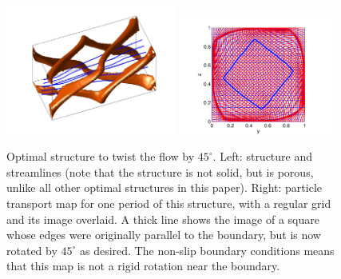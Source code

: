 \documentclass[times]{fldauth}
\begin{document}
\begin{figure}
  \centerline{
    \includegraphics[width=0.5\textwidth,trim=60 30 50 20,clip]{example3structure}
    \hfill
    \includegraphics[width=0.45\textwidth,trim=50 0 60 20,clip]{example3grid}}
  \caption{\label{example3figure1} Optimal structure to twist the flow
    by $45^\circ$. Left: structure and streamlines (note that the
    structure is not solid, but is porous, unlike all other optimal
    structures in this paper). Right: particle transport map for one
    period of this structure, with a regular grid and its image
    overlaid. A thick line shows the image of a square whose edges
    were originally parallel to the boundary, but is now rotated by
    $45^\circ$ as desired. The non-slip boundary conditions means that
    this map is not a rigid rotation near the boundary.}
\end{figure}
\end{document}
